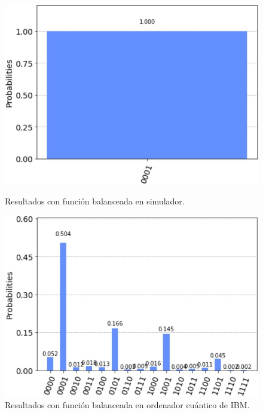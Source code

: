 \begin{figure}[tb!]
    \centering
    \begin{minipage}{0.45\textwidth}
        \centering
        \includegraphics[width=1\textwidth]{images/simulator_balanced}
        \caption{Resultados con función balanceada en simulador.}
        \label{fig:fig64}
    \end{minipage}\hfill
    \begin{minipage}{0.45\textwidth}
        \centering
        \includegraphics[width=1\textwidth]{images/ibmq_balanced}
        \caption{Resultados con función balanceada en ordenador cuántico de IBM.}
        \label{fig:fig65}
    \end{minipage}
\end{figure}


